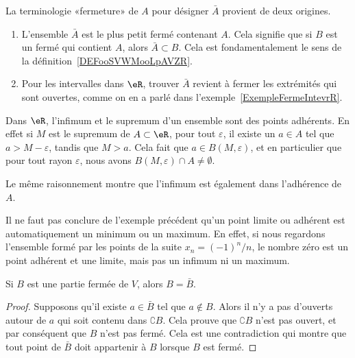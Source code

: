 \begin{example}     \label{EXooICLBooJzQFNY}
	La terminologie «fermeture» de \( A\) pour désigner \( \bar A\) provient de deux origines.
	\begin{enumerate}
		\item
		      L'ensemble \( \bar A\) est le plus petit fermé contenant \( A\). Cela signifie que si \( B\) est un fermé qui contient \( A\), alors \( \bar A\subset B\). Cela est fondamentalement le sens de la définition~\ref{DEFooSVWMooLpAVZR}.
		\item
		      Pour les intervalles dans \( \eR\), trouver \( \bar A\) revient à fermer les extrémités qui sont ouvertes, comme on en a parlé dans l'exemple~\ref{ExempleFermeIntevrR}.
	\end{enumerate}
\end{example}

\begin{example}
	Dans \( \eR\), l'infimum et le supremum d'un ensemble sont des points adhérents. En effet si \( M\) est le supremum de \( A\subset\eR\), pour tout \( \varepsilon\), il existe un \( a\in A\) tel que \( a>M-\varepsilon\), tandis que \( M>a\). Cela fait que \( a\in B(M,\varepsilon)\), et en particulier que pour tout rayon \( \varepsilon\), nous avons \( B(M,\varepsilon)\cap A\neq\emptyset\).

	Le même raisonnement montre que l'infimum est également dans l'adhérence de \( A\).
\end{example}

\begin{example}		\label{ParlerEncoredeF}
	Il ne faut pas conclure de l'exemple précédent qu'un point limite ou adhérent est automatiquement un minimum ou un maximum. En effet, si nous regardons l'ensemble formé par les points de la suite \( x_n=(-1)^n/n\), le nombre zéro est un point adhérent et une limite, mais pas un infimum ni un maximum.
\end{example}

\begin{lemma}
	Si \( B\) est une partie fermée de \( V\), alors \( B=\bar B\).
\end{lemma}

\begin{proof}
	Supposons qu'il existe \( a\in\bar B\) tel que \( a\notin B\). Alors il n'y a pas d'ouverts autour de \( a\) qui soit contenu dans \( \complement B\). Cela prouve que \( \complement B\) n'est pas ouvert, et par conséquent que \( B\) n'est pas fermé. Cela est une contradiction qui montre que tout point de \( \bar B\) doit appartenir à \( B\) lorsque \( B\) est fermé.
\end{proof}

